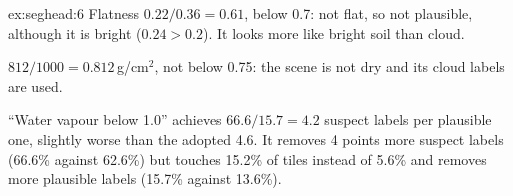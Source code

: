 \begin{solution}{ex:seghead:6}
Flatness $0.22 / 0.36 = 0.61$, below 0.7: not flat, so not plausible, although it is bright ($0.24 > 0.2$). It looks more like bright soil than
cloud.

$812 / 1000 = 0.812$\,g/cm$^2$, not below 0.75: the scene is not dry and its cloud labels are used.

``Water vapour below 1.0'' achieves $66.6 / 15.7 = 4.2$ suspect labels per plausible one, slightly worse than the adopted 4.6. It removes 4 points
more suspect labels (66.6\% against 62.6\%) but touches 15.2\% of tiles instead of 5.6\% and removes more plausible labels (15.7\% against 13.6\%).
\end{solution}
